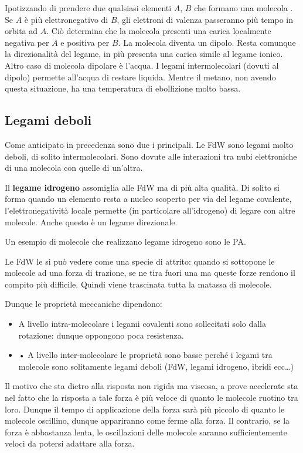 Ipotizzando di prendere due qualsiasi elementi $A$, $B$
che formano una molecola .
Se $A$ è più elettronegativo di $B$, gli elettroni di valenza passeranno più tempo in orbita ad $A$. 
Ciò determina che la molecola presenti una carica localmente negativa per $A$ e positiva per $B$. 
La molecola diventa un dipolo. Resta comunque la direzionalità del legame, in più presenta una carica simile al legame ionico. 
Altro caso di molecola dipolare è l'acqua.
I legami intermolecolari (dovuti al dipolo) permette all'acqua di restare liquida.
Mentre il metano, non avendo questa situazione, ha una temperatura di ebollizione molto bassa.

\subsection{Legami deboli}
Come anticipato in precedenza sono due i principali.
Le \ac{FdW} sono legami molto deboli, di solito intermolecolari. Sono dovute alle interazioni tra nubi elettroniche di una molecola con quelle di un'altra.

Il \textbf{legame idrogeno} assomiglia alle \ac{FdW} ma di più alta qualità. Di solito si forma quando un elemento resta a nucleo scoperto per via del legame covalente, l'elettronegatività locale permette (in particolare all'idrogeno) di legare con altre molecole.
Anche questo è un legame direzionale.

Un esempio di molecole che realizzano legame idrogeno sono le \ac{PA}.

Le \ac{FdW} le si può vedere come una specie di attrito: quando si sottopone le molecole ad una forza di trazione, se ne tira fuori una ma queste forze rendono il compito più difficile. Quindi viene trascinata tutta la matassa di molecole.

Dunque le proprietà meccaniche dipendono:
\begin{itemize}
\item A livello intra-molecolare i legami covalenti sono sollecitati solo dalla rotazione: dunque oppongono poca resistenza.
\item •	A livello inter-molecolare le proprietà sono basse perché i legami tra molecole sono solitamente legami deboli (FdW, legami idrogeno, ibridi ecc\dots)
\end{itemize}

Il motivo che sta dietro alla risposta non rigida ma viscosa, a prove accelerate sta nel fatto che la risposta a tale forza è più veloce di quanto le molecole ruotino tra loro.
Dunque il tempo di applicazione della forza sarà più piccolo di quanto le molecole oscillino, dunque appariranno come ferme alla forza.
Il contrario, se la forza è abbastanza lenta, le oscillazioni delle molecole saranno sufficientemente veloci da potersi adattare alla forza.


